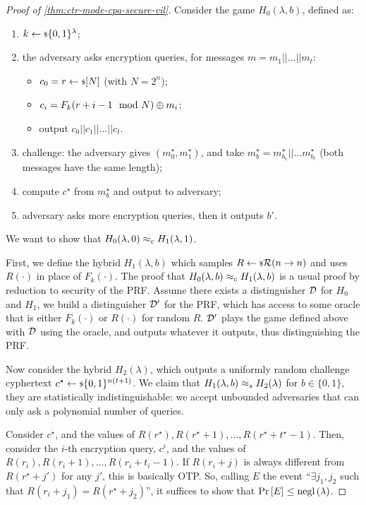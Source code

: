\begin{proof}[Proof of \cref{thm:ctr-mode-cpa-secure-vil}]
	Consider the game $H_0(\lambda, b)$, defined as:
	\begin{enumerate}
		\item $k \leftarrow {\scriptstyle \$} {\{0,1\}^{\lambda}}$;
		\item the adversary asks encryption queries, for messages $m = m_1 || \dots || m_t$:
			\begin{itemize}
				\item $c_0 = r \leftarrow {\scriptstyle \$} {[N]}$ (with $N = 2^n$);
				\item $c_i = F_k(r+i-1 \mod N) \oplus m_i$;
				\item output $c_0 || c_1 || \dots || c_t$.
			\end{itemize}
		\item challenge: the adversary gives $(m_0^{\star}, m_1^{\star})$, and take $m_b^{\star} = m_{b_1}^{\star} || \dots m_{b_t}^{\star}$ (both messages have the same length);
		\item compute $c^{\star}$ from $m_b^{\star}$ and output to adversary;
		\item adversary asks more encryption queries, then it outputs $b'$.
	\end{enumerate}
	We want to show that $H_0(\lambda,0) \approx_c H_1(\lambda,1)$.

	First, we define the hybrid $H_1(\lambda, b)$ which samples $R \leftarrow {\scriptstyle \$} {\mathcal{R}(n \to n)}$ and uses $R(\cdot)$ in place of $F_k(\cdot)$.
	The proof that $H_0(\lambda, b) \approx_c H_1(\lambda, b)$ is a usual proof by reduction to security of the \ac{PRF}.
	Assume there exists a distinguisher $\mathcal{D}$ for $H_0$ and $H_1$, we build a distinguisher $\mathcal{D}'$ for the \ac{PRF}, which has access to some oracle that is either $F_k(\cdot)$ or $R(\cdot)$ for random $R$.
	$\mathcal{D}'$ plays the game defined above with $\mathcal{D}$ using the oracle, and outputs whatever it outputs, thus distinguishing the \ac{PRF}.

	Now consider the hybrid $H_2(\lambda)$, which outputs a uniformly random challenge cyphertext $c^{\star} \leftarrow {\scriptstyle \$} {\{0,1\}^{n(t+1)}}$.
	We claim that $H_1(\lambda, b) \approx_s H_2(\lambda)$ for $b \in \{0,1\}$, \ie they are statistically indistinguishable: we accept unbounded adversaries that can only ask a polynomial number of queries.

	Consider $c^{\star}$, and the values of $R(r^{\star}), R(r^{\star} + 1), \dots, R(r^{\star} + t^{\star} - 1)$.
	Then, consider the $i$-th encryption query, $c^i$, and the values of $R(r_i), R(r_i+1), \dots, R(r_i + t_i - 1)$.
	If $R(r_i + j)$ is always different from $R(r^{\star} + j')$ for any $j'$, this is basically \ac{OTP}.
	So, calling $E$ the event ``$\exists j_1, j_2$ such that $R(r_i + j_1) = R(r^{\star} + j_2)$'', it suffices to show that $\mathop{\mathrm{Pr}}\limits_{} \left[ {E} \right] \le \mathrm{negl}\left({\lambda}\right)$.


\end{proof}
